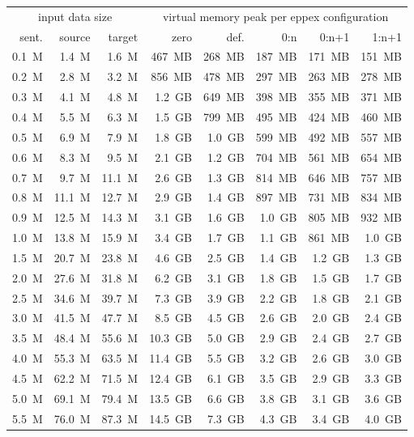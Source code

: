 \begin{table}[!htb]
\centering
\def\arraystretch{1.1}
\begin{tabular}{ | r  r  r | r  r  r  r  r | }
\hline
\multicolumn{3}{|c|}{input data size} & \multicolumn{5}{|c|}{virtual memory peak per eppex configuration} \\
sent. & source & target & zero & def. & 0:n & 0:n+1 & 1:n+1 \\
\hline
\hline
0.1~M & 1.4~M & 1.6~M & 467~MB & 268~MB & 187~MB & 171~MB & 151~MB \\
0.2~M & 2.8~M & 3.2~M & 856~MB & 478~MB & 297~MB & 263~MB & 278~MB \\
0.3~M & 4.1~M & 4.8~M & 1.2~GB & 649~MB & 398~MB & 355~MB & 371~MB \\
0.4~M & 5.5~M & 6.3~M & 1.5~GB & 799~MB & 495~MB & 424~MB & 460~MB \\
0.5~M & 6.9~M & 7.9~M & 1.8~GB & 1.0~GB & 599~MB & 492~MB & 557~MB \\
0.6~M & 8.3~M & 9.5~M & 2.1~GB & 1.2~GB & 704~MB & 561~MB & 654~MB \\
0.7~M & 9.7~M & 11.1~M & 2.6~GB & 1.3~GB & 814~MB & 646~MB & 757~MB \\
0.8~M & 11.1~M & 12.7~M & 2.9~GB & 1.4~GB & 897~MB & 731~MB & 834~MB \\
0.9~M & 12.5~M & 14.3~M & 3.1~GB & 1.6~GB & 1.0~GB & 805~MB & 932~MB \\
1.0~M & 13.8~M & 15.9~M & 3.4~GB & 1.7~GB & 1.1~GB & 861~MB & 1.0~GB \\
1.5~M & 20.7~M & 23.8~M & 4.6~GB & 2.5~GB & 1.4~GB & 1.2~GB & 1.3~GB \\
2.0~M & 27.6~M & 31.8~M & 6.2~GB & 3.1~GB & 1.8~GB & 1.5~GB & 1.7~GB \\
2.5~M & 34.6~M & 39.7~M & 7.3~GB & 3.9~GB & 2.2~GB & 1.8~GB & 2.1~GB \\
3.0~M & 41.5~M & 47.7~M & 8.5~GB & 4.5~GB & 2.6~GB & 2.0~GB & 2.4~GB \\
3.5~M & 48.4~M & 55.6~M & 10.3~GB & 5.0~GB & 2.9~GB & 2.4~GB & 2.7~GB \\
4.0~M & 55.3~M & 63.5~M & 11.4~GB & 5.5~GB & 3.2~GB & 2.6~GB & 3.0~GB \\
4.5~M & 62.2~M & 71.5~M & 12.4~GB & 6.1~GB & 3.5~GB & 2.9~GB & 3.3~GB \\
5.0~M & 69.1~M & 79.4~M & 13.5~GB & 6.6~GB & 3.8~GB & 3.1~GB & 3.6~GB \\
5.5~M & 76.0~M & 87.3~M & 14.5~GB & 7.3~GB & 4.3~GB & 3.4~GB & 4.0~GB \\

\end{tabular}
\end{table}
